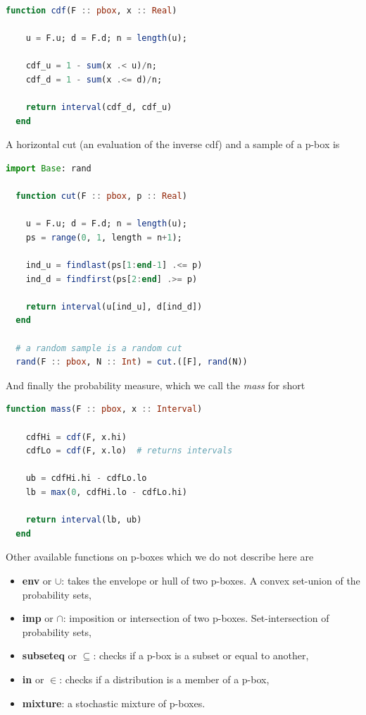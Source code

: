 \documentclass{juliacon}
\begin{document}
\begin{lstlisting}[language = Julia]
  function cdf(F :: pbox, x :: Real)
    
    u = F.u; d = F.d; n = length(u);
    
    cdf_u = 1 - sum(x .< u)/n;
    cdf_d = 1 - sum(x .<= d)/n;
    
    return interval(cdf_d, cdf_u)
  end
\end{lstlisting}
A horizontal cut (an evaluation of the inverse cdf) and a sample of a p-box is
\begin{lstlisting}[language = Julia]
  import Base: rand

  function cut(F :: pbox, p :: Real)

    u = F.u; d = F.d; n = length(u);
    ps = range(0, 1, length = n+1);

    ind_u = findlast(ps[1:end-1] .<= p)
    ind_d = findfirst(ps[2:end] .>= p)
    
    return interval(u[ind_u], d[ind_d])
  end

  # a random sample is a random cut
  rand(F :: pbox, N :: Int) = cut.([F], rand(N))
\end{lstlisting}
And finally the probability measure, which we call the \textit{mass} for short
\begin{lstlisting}[language = Julia]
  function mass(F :: pbox, x :: Interval)

    cdfHi = cdf(F, x.hi)  
    cdfLo = cdf(F, x.lo)  # returns intervals

    ub = cdfHi.hi - cdfLo.lo
    lb = max(0, cdfHi.lo - cdfLo.hi)

    return interval(lb, ub)
  end
\end{lstlisting}
\noindent Other available functions on p-boxes which we do not describe here are
\begin{itemize}
  \item \textbf{env} or $\cup$: takes the envelope or hull of two p-boxes. A convex set-union of the probability sets,
  \item \textbf{imp} or $\cap$: imposition or intersection of two p-boxes. Set-intersection of probability sets,
  \item \textbf{subseteq} or $\subseteq$: checks if a p-box is a subset or equal to another,
  \item \textbf{in} or $\in$: checks if a distribution is a member of a p-box,
  \item \textbf{mixture}: a stochastic mixture of p-boxes.
\end{itemize}
\end{document}
